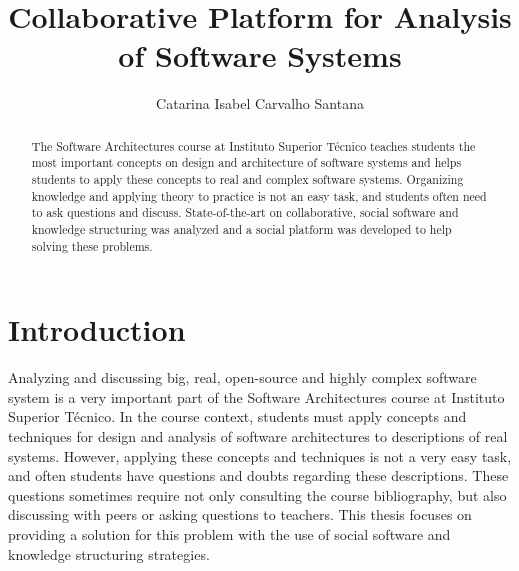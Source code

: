 \documentclass{llncs}
\begin{document}
\title{Collaborative Platform for Analysis of Software Systems}
%
%
\author{Catarina Isabel Carvalho Santana}
%
%
%
%
%

\maketitle              %

\begin{abstract}
The Software Architectures course at Instituto Superior T\'{e}cnico teaches students the most important concepts on design and architecture of software systems and helps students to apply these concepts to real and complex software systems. Organizing knowledge and applying theory to practice is not an easy task, and students often need to ask questions and discuss. State-of-the-art on collaborative, social software and knowledge structuring was analyzed and a social platform was developed to help solving these problems.

\end{abstract}
%
\section{Introduction}
\label{introduction}
Analyzing and discussing big, real, open-source and highly complex software system is a very important part of the Software Architectures course at Instituto Superior T\'{e}cnico. In the course context, students must apply concepts and techniques for design and analysis of software architectures to descriptions of real systems. However, applying these concepts and techniques is not a very easy task, and often students have questions and doubts regarding these descriptions. These questions sometimes require not only consulting the course bibliography, but also discussing with peers or asking questions to teachers. This thesis focuses on providing a solution for this problem with the use of social software and knowledge structuring strategies.
\end{document}
